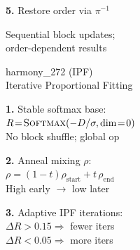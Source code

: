 \documentclass[8pt]{article}
\newlength{\colw}
\begin{document}
\begin{minipage}[t]{\colw}
\begin{stepbox}
\textbf{5.} Restore order via $\pi^{-1}$
\end{stepbox}

\vspace{4pt}
\begin{center}
{\scriptsize\color{black!50} Sequential block updates;\\
order-dependent results}
\end{center}
\end{minipage}%
\hfill
\begin{minipage}[t]{\colw}
\begin{tcolorbox}[colback=hdrB, colframe=hdrB, fontupper=\bfseries\footnotesize\color{white},
    arc=2pt, left=2pt, right=2pt, top=1pt, bottom=1pt]
\centering harmony\_272 (IPF)\\[-2pt]
{\scriptsize\mdseries Iterative Proportional Fitting}
\end{tcolorbox}
\vspace{1pt}

\begin{keyboxG}
\textbf{1.} Stable softmax base:\\
$R\!=\!\textsc{Softmax}(-D/\sigma,\text{dim}\!=\!0)$\\
{\scriptsize\color{added} No block shuffle; global op}
\end{keyboxG}\vspace{1pt}

\begin{keyboxG}
\textbf{2.} Anneal mixing $\rho$:\\
$\rho\!=\!(1\!-\!t)\rho_\text{start}+t\,\rho_\text{end}$\\
{\scriptsize High early $\to$ low later}
\end{keyboxG}\vspace{1pt}

\begin{stepbox}
\textbf{3.} Adaptive IPF iterations:\\
$\Delta R\!>\!0.15\!\Rightarrow$ fewer iters\\
$\Delta R\!<\!0.05\!\Rightarrow$ more iters
\end{stepbox}\vspace{1pt}


\end{minipage}
\end{document}
